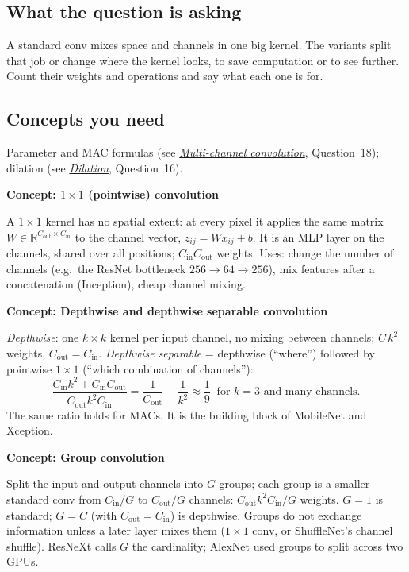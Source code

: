 \documentclass[12pt,a4paper]{article}
\newcommand{\concept}[2]{\par\medskip\phantomsection\label{#1}{\large\bfseries\color{blue!50!black} Concept: #2}\par}
\newcommand{\seeconcept}[3]{(see \hyperref[#1]{\textit{#2}}, Question~#3)}
\begin{document}
\subsection*{What the question is asking}
A standard conv mixes space and channels in one big kernel. The variants split that job or change where the kernel looks, to save computation or to see further. Count their weights and operations and say what each one is for.

\subsection*{Concepts you need}
Parameter and MAC formulas \seeconcept{c:multichannel}{Multi-channel convolution}{18}; dilation \seeconcept{c:dilation}{Dilation}{16}.

\concept{c:pointwise}{$1\times1$ (pointwise) convolution}
A $1\times1$ kernel has no spatial extent: at every pixel it applies the same matrix $W\in\mathbb R^{C_{\text{out}}\times C_{\text{in}}}$ to the channel vector, $z_{ij}=Wx_{ij}+b$. It is an MLP layer on the channels, shared over all positions; $C_{\text{in}}C_{\text{out}}$ weights. Uses: change the number of channels (e.g.\ the ResNet bottleneck $256\to64\to256$), mix features after a concatenation (Inception), cheap channel mixing.

\concept{c:depthwise}{Depthwise and depthwise separable convolution}
\emph{Depthwise}: one $k\times k$ kernel per input channel, no mixing between channels; $C\,k^2$ weights, $C_{\text{out}}=C_{\text{in}}$. \emph{Depthwise separable} = depthwise (``where'') followed by pointwise $1\times1$ (``which combination of channels''):
\[
\frac{C_{\text{in}}k^2+C_{\text{in}}C_{\text{out}}}{C_{\text{out}}k^2C_{\text{in}}}=\frac1{C_{\text{out}}}+\frac1{k^2}\approx\frac19\ \text{ for }k=3\text{ and many channels.}
\]
The same ratio holds for MACs. It is the building block of MobileNet and Xception.

\concept{c:groupconv}{Group convolution}
Split the input and output channels into $G$ groups; each group is a smaller standard conv from $C_{\text{in}}/G$ to $C_{\text{out}}/G$ channels: $C_{\text{out}}k^2C_{\text{in}}/G$ weights. $G=1$ is standard; $G=C$ (with $C_{\text{out}}=C_{\text{in}}$) is depthwise. Groups do not exchange information unless a later layer mixes them ($1\times1$ conv, or ShuffleNet's channel shuffle). ResNeXt calls $G$ the cardinality; AlexNet used groups to split across two GPUs.
\end{document}
